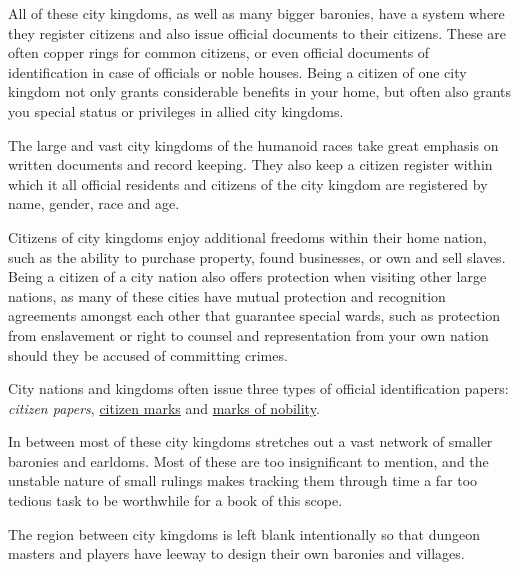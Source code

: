 All of these city kingdoms, as well as many bigger baronies, have a system
where they register citizens and also issue official documents to their
citizens. These are often copper rings for common citizens, or even official
documents of identification in case of officials or noble houses. Being a
citizen of one city kingdom not only grants considerable benefits in your
home, but often also grants you special status or privileges in allied city
kingdoms.

The large and vast city kingdoms of the humanoid races take great emphasis
on written documents and record keeping. They also keep a citizen register
within which it all official residents and citizens of the city kingdom are
registered by name, gender, race and age.

Citizens of city kingdoms enjoy additional freedoms within their home nation,
such as the ability to purchase property, found businesses, or own and sell
slaves. Being a citizen of a city nation also offers protection when visiting
other large nations, as many of these cities have mutual protection and
recognition agreements amongst each other that guarantee special wards, such
as protection from enslavement or right to counsel and representation from your
own nation should they be accused of committing crimes.

City nations and kingdoms often issue three types of official identification
papers: \emph{citizen papers}, \hyperref[sec:Citizen Mark]{citizen marks} and
\hyperref[sec:Nobility Mark]{marks of nobility}.

In between most of these city kingdoms stretches out a vast network of smaller
baronies and earldoms. Most of these are too insignificant to mention, and the
unstable nature of small rulings makes tracking them through time a far too
tedious task to be worthwhile for a book of this scope.


\begin{note}
  The region between city kingdoms is left blank intentionally so that dungeon
  masters and players have leeway to design their own baronies and villages.
\end{note}














